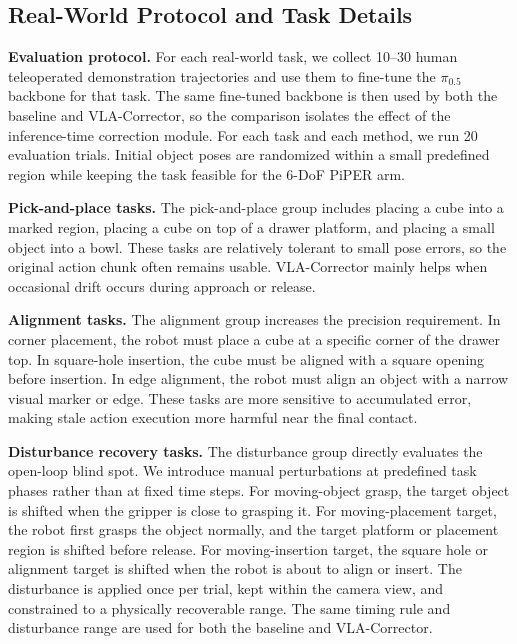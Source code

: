 \subsection{Real-World Protocol and Task Details}
\label{app:real_world_protocol}

\textbf{Evaluation protocol.}
For each real-world task, we collect 10--30 human teleoperated demonstration trajectories and use them to fine-tune the $\pi_{0.5}$ backbone for that task. The same fine-tuned backbone is then used by both the baseline and VLA-Corrector, so the comparison isolates the effect of the inference-time correction module. For each task and each method, we run 20 evaluation trials. Initial object poses are randomized within a small predefined region while keeping the task feasible for the 6-DoF PiPER arm.

\textbf{Pick-and-place tasks.}
The pick-and-place group includes placing a cube into a marked region, placing a cube on top of a drawer platform, and placing a small object into a bowl. These tasks are relatively tolerant to small pose errors, so the original action chunk often remains usable. VLA-Corrector mainly helps when occasional drift occurs during approach or release.

\textbf{Alignment tasks.}
The alignment group increases the precision requirement. In corner placement, the robot must place a cube at a specific corner of the drawer top. In square-hole insertion, the cube must be aligned with a square opening before insertion. In edge alignment, the robot must align an object with a narrow visual marker or edge. These tasks are more sensitive to accumulated error, making stale action execution more harmful near the final contact.

\textbf{Disturbance recovery tasks.}
The disturbance group directly evaluates the open-loop blind spot. We introduce manual perturbations at predefined task phases rather than at fixed time steps. For moving-object grasp, the target object is shifted when the gripper is close to grasping it. For moving-placement target, the robot first grasps the object normally, and the target platform or placement region is shifted before release. For moving-insertion target, the square hole or alignment target is shifted when the robot is about to align or insert. The disturbance is applied once per trial, kept within the camera view, and constrained to a physically recoverable range. The same timing rule and disturbance range are used for both the baseline and VLA-Corrector.

